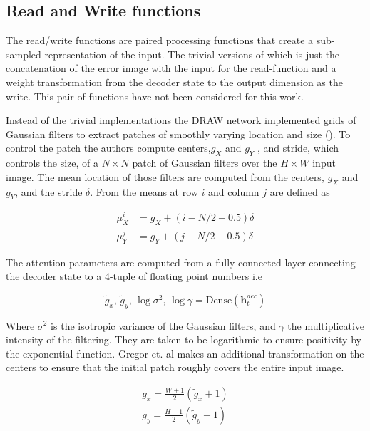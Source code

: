  \subsection{Read and Write functions}

 The read/write functions are paired processing functions that create a sub-sampled representation of the input. The trivial versions of which is just the concatenation of the error image with the input for the read-function and a weight transformation from the decoder state to the output dimension as the write. This pair of functions have not been considered for this work. 

 Instead of the trivial implementations the DRAW network implemented grids of Gaussian filters to extract patches of smoothly varying location and size (\cite{Gregor2015}). To control the patch the authors compute centers,$g_X$ and $g_Y$ , and stride, which controls the size, of a $N \times N$ patch of Gaussian filters over the $H \times W$ input image. The mean location of those filters are computed from the centers, $g_X$ and $g_Y$, and the stride $\delta$. From \citet{Gregor2015} the means at row $i$ and column $j$ are defined as 

 \begin{align}
 \mu_X^i &= g_X + (i - N/2-0.5)\delta \\
 \mu_Y^j &= g_Y + (j - N/2-0.5)\delta
 \end{align}

\noindent The attention parameters are computed from a fully connected layer connecting the decoder state to a 4-tuple of floating point numbers i.e

\begin{equation}\label{eq:draw_params}
\tilde{g}_x, \,\tilde{g}_y, \, \log \sigma^2, \, \log \gamma = \text{Dense} (\mathbf{h}_t^{dec})
\end{equation}

\noindent Where $\sigma^2$ is the isotropic variance of the Gaussian filters, and $\gamma$ the multiplicative intensity of the filtering. They are taken to be logarithmic to ensure positivity by the exponential function. Gregor et. al makes an additional transformation on the centers to ensure that the initial patch roughly covers the entire input image. 

\begin{align}
g_x = \frac{W +1 }{2} (\tilde{g}_x +1 ) \\
g_y = \frac{H +1 }{2} (\tilde{g}_y +1 ) \\
\end{align}

